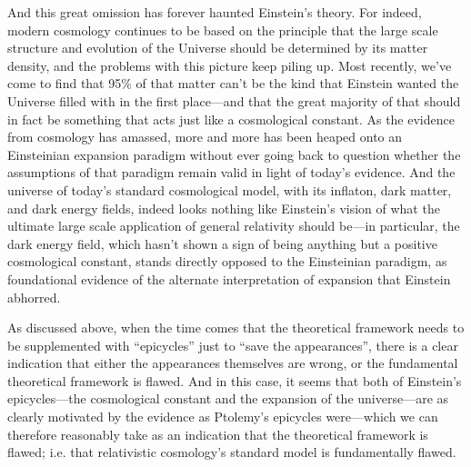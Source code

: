 \documentclass[12 pt]{article}
\begin{document}
And this great omission has forever haunted Einstein's theory. For indeed, modern cosmology continues to be based on the principle that the large scale structure and evolution of the Universe should be determined by its matter density, and the problems with this picture keep piling up. Most recently, we've come to find that 95\% of that matter can't be the kind that Einstein wanted the Universe filled with in the first place---and that the great majority of that should in fact be something that acts just like a cosmological constant. As the evidence from cosmology has amassed, more and more has been heaped onto an Einsteinian expansion paradigm without ever going back to question whether the assumptions of that paradigm remain valid in light of today's evidence. And the universe of today's standard cosmological model, with its inflaton, dark matter, and dark energy fields, indeed looks nothing like Einstein's vision of what the ultimate large scale application of general relativity should be---in particular, the dark energy field, which hasn't shown a sign of being anything but a positive cosmological constant, stands directly opposed to the Einsteinian paradigm, as foundational evidence of the alternate interpretation of expansion that Einstein abhorred.

As discussed above, when the time comes that the theoretical framework needs to be supplemented with ``epicycles'' just to ``save the appearances'', there is a clear indication that either the appearances themselves are wrong, or the fundamental theoretical framework is flawed. And in this case, it seems that both of Einstein's epicycles---the cosmological constant and the expansion of the universe---are as clearly motivated by the evidence as Ptolemy's epicycles were---which we can therefore reasonably take as an indication that the theoretical framework is flawed; i.e. that relativistic cosmology's standard model is fundamentally flawed. 
\end{document}

